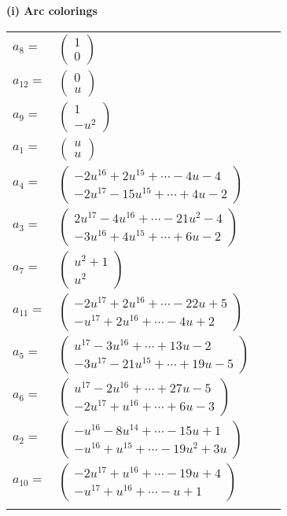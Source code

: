 \documentclass[1p]{elsarticle_modified}
\theoremstyle{definition}
\begin{document}
\flushleft \textbf{(i) Arc colorings}\\
\begin{tabular}{m{7pt} m{180pt} m{7pt} m{180pt} }
\flushright $a_{8}=$&$\begin{pmatrix}1\\0\end{pmatrix}$ \\
\flushright $a_{12}=$&$\begin{pmatrix}0\\u\end{pmatrix}$ \\
\flushright $a_{9}=$&$\begin{pmatrix}1\\- u^2\end{pmatrix}$ \\
\flushright $a_{1}=$&$\begin{pmatrix}u\\u\end{pmatrix}$ \\
\flushright $a_{4}=$&$\begin{pmatrix}-2 u^{16}+2 u^{15}+\cdots-4 u-4\\-2 u^{17}-15 u^{15}+\cdots+4 u-2\end{pmatrix}$ \\
\flushright $a_{3}=$&$\begin{pmatrix}2 u^{17}-4 u^{16}+\cdots-21 u^2-4\\-3 u^{16}+4 u^{15}+\cdots+6 u-2\end{pmatrix}$ \\
\flushright $a_{7}=$&$\begin{pmatrix}u^2+1\\u^2\end{pmatrix}$ \\
\flushright $a_{11}=$&$\begin{pmatrix}-2 u^{17}+2 u^{16}+\cdots-22 u+5\\- u^{17}+2 u^{16}+\cdots-4 u+2\end{pmatrix}$ \\
\flushright $a_{5}=$&$\begin{pmatrix}u^{17}-3 u^{16}+\cdots+13 u-2\\-3 u^{17}-21 u^{15}+\cdots+19 u-5\end{pmatrix}$ \\
\flushright $a_{6}=$&$\begin{pmatrix}u^{17}-2 u^{16}+\cdots+27 u-5\\-2 u^{17}+u^{16}+\cdots+6 u-3\end{pmatrix}$ \\
\flushright $a_{2}=$&$\begin{pmatrix}- u^{16}-8 u^{14}+\cdots-15 u+1\\- u^{16}+u^{15}+\cdots-19 u^2+3 u\end{pmatrix}$ \\
\flushright $a_{10}=$&$\begin{pmatrix}-2 u^{17}+u^{16}+\cdots-19 u+4\\- u^{17}+u^{16}+\cdots- u+1\end{pmatrix}$\\&\end{tabular}
\end{document}
